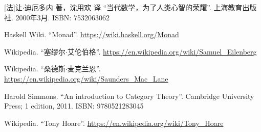 \documentclass{article}
\begin{document}
\ifx\wholebook\relax \else
\begin{thebibliography}{99}

[法]让$\cdot$迪厄多内 著，沈用欢 译 ``当代数学，为了人类心智的荣耀''. 上海教育出版社. 2000年3月. ISBN: 7532063062

Haskell Wiki. ``Monad''. \url{https://wiki.haskell.org/Monad}

Wikipedia. ``塞缪尔$\cdot$艾伦伯格''. \url{https://en.wikipedia.org/wiki/Samuel_Eilenberg}

Wikipedia. ``桑德斯$\cdot$麦克兰恩''. \url{https://en.wikipedia.org/wiki/Saunders_Mac_Lane}

Harold Simmons. ``An introduction to Category Theory''.  Cambridge University Press; 1 edition, 2011. ISBN: 9780521283045

Wikipedia. ``Tony Hoare''. \url{https://en.wikipedia.org/wiki/Tony_Hoare}

\end{thebibliography}

\expandafter\enddocument

\fi
\end{document}
